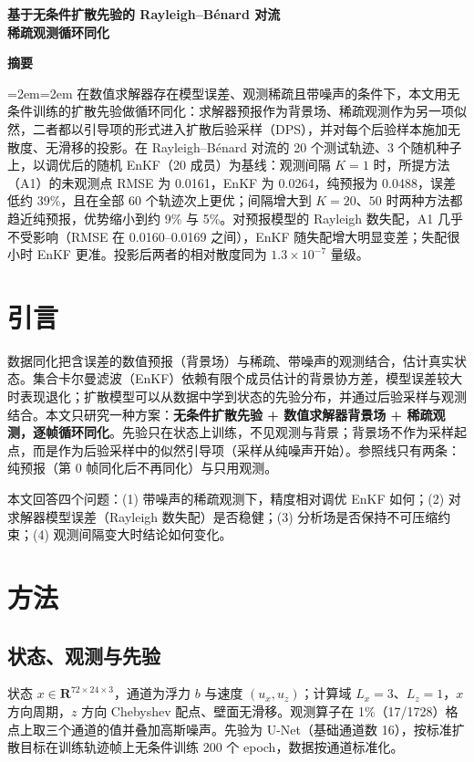 \documentclass[10.5pt,a4paper]{article}
\begin{document}
\begin{center}
{\LARGE\bfseries 基于无条件扩散先验的 Rayleigh--B\'enard 对流\\稀疏观测循环同化\par}\vspace{.6em}
\end{center}
\begin{center}\textbf{摘\quad 要}\end{center}
\begingroup\small\leftskip=2em\rightskip=2em
在数值求解器存在模型误差、观测稀疏且带噪声的条件下，本文用无条件训练的扩散先验做循环同化：求解器预报作为背景场、稀疏观测作为另一项似然，二者都以引导项的形式进入扩散后验采样（DPS），并对每个后验样本施加无散度、无滑移的投影。在 Rayleigh--B\'enard 对流的 20 个测试轨迹、3 个随机种子上，以调优后的随机 EnKF（20 成员）为基线：观测间隔 $K=1$ 时，所提方法（A1）的未观测点 RMSE 为 0.0161，EnKF 为 0.0264，纯预报为 0.0488，误差低约 39\%，且在全部 60 个轨迹次上更优；间隔增大到 $K=20$、$50$ 时两种方法都趋近纯预报，优势缩小到约 9\% 与 5\%。对预报模型的 Rayleigh 数失配，A1 几乎不受影响（RMSE 在 0.0160--0.0169 之间），EnKF 随失配增大明显变差；失配很小时 EnKF 更准。投影后两者的相对散度同为 $1.3\times10^{-7}$ 量级。
\endgroup

\section{引言}
数据同化把含误差的数值预报（背景场）与稀疏、带噪声的观测结合，估计真实状态。集合卡尔曼滤波（EnKF）依赖有限个成员估计的背景协方差，模型误差较大时表现退化；扩散模型可以从数据中学到状态的先验分布，并通过后验采样与观测结合。本文只研究一种方案：\textbf{无条件扩散先验 + 数值求解器背景场 + 稀疏观测，逐帧循环同化}。先验只在状态上训练，不见观测与背景；背景场不作为采样起点，而是作为后验采样中的似然引导项（采样从纯噪声开始）。参照线只有两条：纯预报（第 0 帧同化后不再同化）与只用观测。

本文回答四个问题：(1) 带噪声的稀疏观测下，精度相对调优 EnKF 如何；(2) 对求解器模型误差（Rayleigh 数失配）是否稳健；(3) 分析场是否保持不可压缩约束；(4) 观测间隔变大时结论如何变化。

\section{方法}
\subsection{状态、观测与先验}
状态 $x\in\mathbf{R}^{72\times24\times3}$，通道为浮力 $b$ 与速度 $(u_x,u_z)$；计算域 $L_x=3$、$L_z=1$，$x$ 方向周期，$z$ 方向 Chebyshev 配点、壁面无滑移。观测算子在 1\%（17/1728）格点上取三个通道的值并叠加高斯噪声。先验为 U-Net（基础通道数 16），按标准扩散目标在训练轨迹帧上无条件训练 200 个 epoch，数据按通道标准化。
\end{document}
